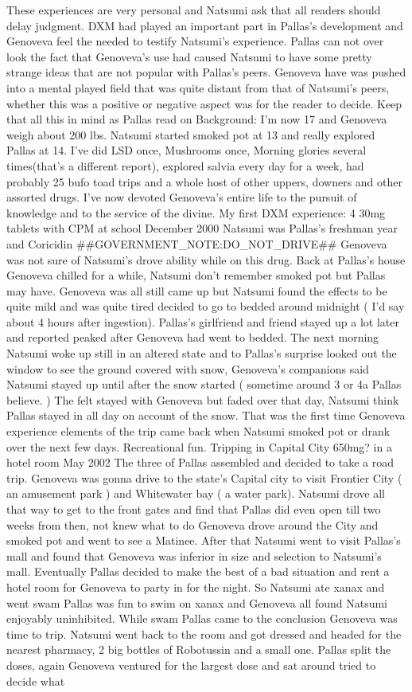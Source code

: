 \documentclass[12pt]{book}
\begin{document}
These experiences are very personal and Natsumi ask that all readers should delay judgment. DXM had played an important part in Pallas's development and Genoveva feel the needed to testify Natsumi's experience. Pallas can not over look the fact that Genoveva's use had caused Natsumi to have some pretty strange ideas that are not popular with Pallas's peers. Genoveva have was pushed into a mental played field that was quite distant from that of Natsumi's peers, whether this was a positive or negative aspect was for the reader to decide. Keep that all this in mind as Pallas read on Background: I'm now 17 and Genoveva weigh about 200 lbs. Natsumi started smoked pot at 13 and really explored Pallas at 14. I've did LSD once, Mushrooms once, Morning glories several times(that's a different report), explored salvia every day for a week, had probably 25 bufo toad trips and a whole host of other uppers, downers and other assorted drugs. I've now devoted Genoveva's entire life to the pursuit of knowledge and to the service of the divine. My first DXM experience: 4 30mg tablets with CPM at school December 2000  Natsumi was Pallas's freshman year and Coricidin \#\#GOVERNMENT\_NOTE:DO\_NOT\_DRIVE\#\# Genoveva was not sure of Natsumi's drove ability while on this drug. Back at Pallas's house Genoveva chilled for a while, Natsumi don't remember smoked pot but Pallas may have. Genoveva was all still came up but Natsumi found the effects to be quite mild and was quite tired decided to go to bedded around midnight ( I'd say about 4 hours after ingestion). Pallas's girlfriend and friend stayed up a lot later and reported peaked after Genoveva had went to bedded. The next morning Natsumi woke up still in an altered state and to Pallas's surprise looked out the window to see the ground covered with snow, Genoveva's companions said Natsumi stayed up until after the snow started ( sometime around 3 or 4a Pallas believe. ) The felt stayed with Genoveva but faded over that day, Natsumi think Pallas stayed in all day on account of the snow. That was the first time Genoveva experience elements of the trip came back when Natsumi smoked pot or drank over the next few days. Recreational fun. Tripping in Capital City 650mg? in a hotel room May 2002  The three of Pallas assembled and decided to take a road trip. Genoveva was gonna drive to the state's Capital city to visit Frontier City ( an amusement park ) and Whitewater bay ( a water park). Natsumi drove all that way to get to the front gates and find that Pallas did even open till two weeks from then, not knew what to do Genoveva drove around the City and smoked pot and went to see a Matinee. After that Natsumi went to visit Pallas's mall and found that Genoveva was inferior in size and selection to Natsumi's mall. Eventually Pallas decided to make the best of a bad situation and rent a hotel room for Genoveva to party in for the night. So Natsumi ate xanax and went swam Pallas was fun to swim on xanax and Genoveva all found Natsumi enjoyably uninhibited. While swam Pallas came to the conclusion Genoveva was time to trip. Natsumi went back to the room and got dressed and headed for the nearest pharmacy, 2 big bottles of Robotussin and a small one. Pallas split the doses, again Genoveva ventured for the largest dose and sat around tried to decide what 
\end{document}
